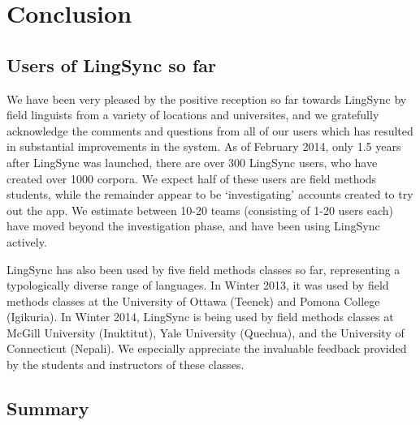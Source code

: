 \documentclass[letterpaper, 12pt, dvips]{mitwpl}
\begin{document}
\section{Conclusion } 
\label{sec:conclusion}

\subsection{Users of LingSync so far}
\label{sec:use}

We have been very pleased by the positive reception so far towards LingSync by field linguists from a variety of locations and universites, and we gratefully acknowledge the comments and questions from all of our users which has resulted in substantial improvements in the system.
As of February 2014, only 1.5 years after LingSync was launched, there are over 300 LingSync users,
who have created over 1000 corpora.
We expect half of these users are field methods students, while the remainder appear to be `investigating' accounts created to try out the app.
We estimate between 10-20 teams (consisting of 1-20 users each) have moved beyond the investigation phase, and have been using LingSync actively.

LingSync has also been used by five field methods classes so far, representing a typologically diverse range of languages.  In Winter 2013, it was used by field methods classes 
at the University of Ottawa (Teenek) and Pomona College  (Igikuria). In Winter 2014, LingSync is being used by field methods classes
at McGill University (Inuktitut),
Yale University (Quechua),
and the University of Connecticut (Nepali).
We especially appreciate the invaluable feedback provided by the students and instructors of these classes.



\subsection{Summary}
\label{sec:summary} 
\end{document}
